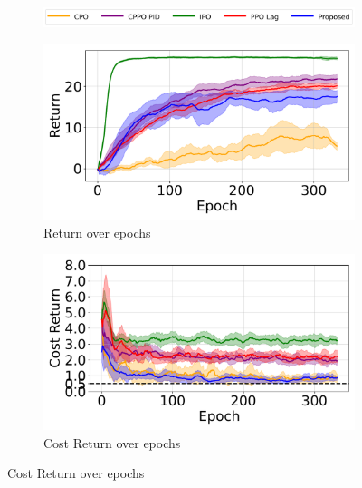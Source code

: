 \begin{figure}[H]
    \centering

    \begin{subfigure}{0.65\textwidth}
        \centering
        \includegraphics[width=\linewidth]{figure/PointGoal/limit 1/legend_common.pdf}
    \end{subfigure}

    \vspace{0.5em} %

    \begin{minipage}{0.48\textwidth}
        \centering
        \begin{subfigure}{\linewidth}
            \centering
            \includegraphics[width=\linewidth]{figure/PointGoal/limit 0.5/EpRet.pdf}
            \caption{Return over epochs}
        \end{subfigure}

        \begin{subfigure}{\linewidth}
            \centering
            \includegraphics[width=\linewidth]{figure/PointGoal/limit 0.5/EpCost.pdf}
            \caption{Cost Return over epochs}
        \end{subfigure}


\end{minipage}
\end{figure}
